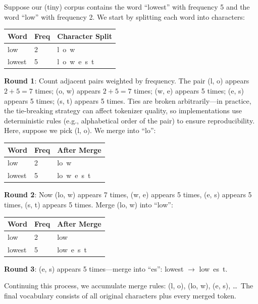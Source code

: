 \begin{keyconcept}
  Suppose our (tiny) corpus contains the word ``lowest'' with frequency 5
  and the word ``low'' with frequency 2. We start by splitting each word
  into characters:

  \begin{center}
  \begin{tabular}{lll}
  \toprule
  \textbf{Word} & \textbf{Freq} & \textbf{Character Split} \\
  \midrule
  low & 2 & l\;\, o\;\, w \\
  lowest & 5 & l\;\, o\;\, w\;\, e\;\, s\;\, t \\
  \bottomrule
  \end{tabular}
  \end{center}

  \textbf{Round 1}: Count adjacent pairs weighted by frequency.
  The pair (l, o) appears $2 + 5 = 7$ times; (o, w) appears $2 + 5 = 7$ times;
  (w, e) appears 5 times; (e, s) appears 5 times; (s, t) appears 5 times.
  Ties are broken arbitrarily---in practice, the tie-breaking
  strategy can affect tokenizer quality, so implementations use
  deterministic rules (e.g., alphabetical order of the pair) to ensure
  reproducibility. Here, suppose we pick (l, o). We merge into ``lo'':

  \begin{center}
  \begin{tabular}{lll}
  \toprule
  \textbf{Word} & \textbf{Freq} & \textbf{After Merge} \\
  \midrule
  low & 2 & lo\;\, w \\
  lowest & 5 & lo\;\, w\;\, e\;\, s\;\, t \\
  \bottomrule
  \end{tabular}
  \end{center}

  \textbf{Round 2}: Now (lo, w) appears 7 times, (w, e) appears 5 times,
  (e, s) appears 5 times, (s, t) appears 5 times. Merge (lo, w) into
  ``low'':

  \begin{center}
  \begin{tabular}{lll}
  \toprule
  \textbf{Word} & \textbf{Freq} & \textbf{After Merge} \\
  \midrule
  low & 2 & low \\
  lowest & 5 & low\;\, e\;\, s\;\, t \\
  \bottomrule
  \end{tabular}
  \end{center}

  \textbf{Round 3}: (e, s) appears 5 times---merge into ``es'':
  lowest $\rightarrow$ low\;\, es\;\, t.

  Continuing this process, we accumulate merge rules: (l, o), (lo, w),
  (e, s), \ldots\ The final vocabulary consists of all original characters
  plus every merged token.
\end{keyconcept}

